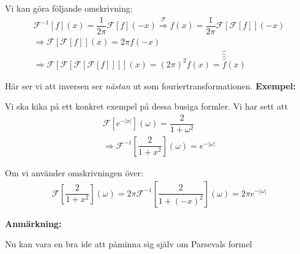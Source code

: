 \par\bigskip
\noindent Vi kan göra följande omskrivning:
\begin{equation*}
  \begin{gathered}
    \mathcal{F}^{-1}[f](x) = \dfrac{1}{2\pi}\mathcal{F}[f](-x)\stackrel{\mathcal{F}}{\Rightarrow}f(x) = \dfrac{1}{2\pi}\mathcal{F}[\mathcal{F}[f]](-x)\\
    \Rightarrow \mathcal{F}[\mathcal{F}[f]](x) = 2\pi f(-x)\\
    \Rightarrow \mathcal{F}[\mathcal{F}[\mathcal{F}[\mathcal{F}[f]]]](x) = (2\pi)^2f(x)=\hat{\hat{\hat{\hat{f}}}}(x)
  \end{gathered}
\end{equation*}
\par\bigskip
\noindent Här ser vi att inversen ser \textit{nästan} ut som fouriertransformationen.
\newpage
\noindent\textbf{Exempel:}\par
\noindent Vi ska kika på ett konkret exempel på dessa busiga formler. Vi har sett att
\begin{equation*}
  \begin{gathered}
    \mathcal{F}[e^{-\left|x\right|}](\omega) = \dfrac{2}{1+\omega^2}\\
    \Rightarrow \mathcal{F}^{-1}\left[\dfrac{2}{1+x^2}\right](\omega) = e^{-\left|\omega\right|}
  \end{gathered}
\end{equation*}
\par\bigskip
\noindent Om vi använder omskrivningen över:
\begin{equation*}
  \begin{gathered}
    \mathcal{F}\left[\dfrac{2}{1+x^2}\right](\omega) =2\pi\mathcal{F}^{-1}\left[\dfrac{2}{1+(-x)^2}\right](\omega) = 2\pi e^{-\left|\omega\right|}
  \end{gathered}
\end{equation*}
\par\bigskip
\noindent\textbf{Anmärkning:}\par
\noindent Nu kan vara en bra ide att påminna sig själv om Parsevals formel
\par\bigskip
